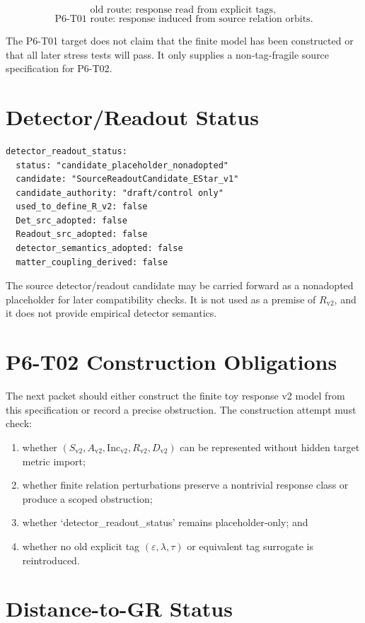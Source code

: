 \documentclass[11pt]{article}
\newcommand{\Sv}{S_{\mathrm{v2}}}
\newcommand{\Av}{A_{\mathrm{v2}}}
\newcommand{\Incv}{\mathrm{Inc}_{\mathrm{v2}}}
\newcommand{\Rv}{R_{\mathrm{v2}}}
\newcommand{\Dv}{D_{\mathrm{v2}}}
\begin{document}
\[
  \text{old route: response read from explicit tags},
\]
\[
  \text{P6-T01 route: response induced from source relation orbits}.
\]

The P6-T01 target does not claim that the finite model has been constructed
or that all later stress tests will pass. It only supplies a non-tag-fragile
source specification for P6-T02.

\section{Detector/Readout Status}

\begin{verbatim}
detector_readout_status:
  status: "candidate_placeholder_nonadopted"
  candidate: "SourceReadoutCandidate_EStar_v1"
  candidate_authority: "draft/control only"
  used_to_define_R_v2: false
  Det_src_adopted: false
  Readout_src_adopted: false
  detector_semantics_adopted: false
  matter_coupling_derived: false
\end{verbatim}

The source detector/readout candidate may be carried forward as a
nonadopted placeholder for later compatibility checks. It is not used as a
premise of \(\Rv\), and it does not provide empirical detector semantics.

\section{P6-T02 Construction Obligations}

The next packet should either construct the finite toy response v2 model from
this specification or record a precise obstruction. The construction attempt
must check:

\begin{enumerate}
  \item whether \((\Sv,\Av,\Incv,\Rv,\Dv)\) can be represented without hidden
        target metric import;
  \item whether finite relation perturbations preserve a nontrivial response
        class or produce a scoped obstruction;
  \item whether `detector_readout_status' remains placeholder-only; and
  \item whether no old explicit tag \((\varepsilon,\lambda,\tau)\) or
        equivalent tag surrogate is reintroduced.
\end{enumerate}

\section{Distance-to-GR Status}
\end{document}
